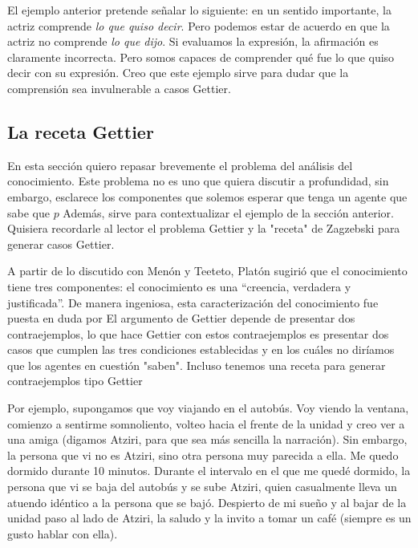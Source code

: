 {{El ejemplo anterior pretende señalar lo siguiente: en un sentido importante, la actriz comprende \emph{lo que quiso decir}.
Pero podemos estar de acuerdo en que la actriz no comprende \emph{lo que dijo}.
Si evaluamos la expresión, la afirmación es claramente incorrecta.
Pero somos capaces de comprender qué fue lo que quiso decir con su expresión.
Creo que este ejemplo sirve para dudar que la comprensión sea invulnerable a casos Gettier.


\subsection{La receta Gettier}

En esta sección quiero repasar brevemente el problema del análisis del conocimiento.
Este problema no es uno que quiera discutir a profundidad, sin embargo, esclarece los componentes que solemos esperar que tenga un agente que sabe que $p$
Además, sirve para contextualizar el ejemplo de la sección anterior.
Quisiera recordarle al lector el problema Gettier y la "receta" de Zagzebski para generar casos Gettier.

A partir de lo discutido con Menón y Teeteto, Platón sugirió que el conocimiento tiene tres componentes: el conocimiento es una “creencia, verdadera y justificada”.
De manera ingeniosa, esta caracterización del conocimiento fue puesta en duda por %
El argumento de Gettier depende de presentar dos contraejemplos, lo que hace Gettier con estos contraejemplos es presentar dos casos que cumplen las tres condiciones establecidas y en los cuáles no diríamos que los agentes en cuestión "saben".
Incluso tenemos una receta para generar contraejemplos tipo Gettier %

Por ejemplo, supongamos que voy viajando en el autobús.
Voy viendo la ventana, comienzo a sentirme somnoliento, volteo hacia el frente de la unidad y creo ver a una amiga (digamos Atziri, para que sea más sencilla la narración).
Sin embargo, la persona que vi no es Atziri, sino otra persona muy parecida a ella.
Me quedo dormido durante 10 minutos.
Durante el intervalo en el que me quedé dormido, la persona que vi se baja del autobús y se sube Atziri, quien casualmente lleva un atuendo idéntico a la persona que se bajó.
Despierto de mi sueño y al bajar de la unidad paso al lado de Atziri, la saludo y la invito a tomar un café (siempre es un gusto hablar con ella).

}}
